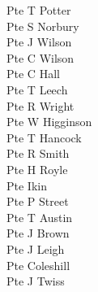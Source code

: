 \begin{multicols}{2}
  Pte T Potter \\
  Pte S Norbury \\
  Pte J Wilson \\
  Pte C Wilson \\
  Pte C Hall \\
  Pte T Leech \\
  Pte R Wright \\
  Pte W Higginson \\
  Pte T Hancock \\
  Pte R Smith \\
  Pte H Royle \\
  Pte Ikin \\
  Pte P Street \\
  Pte T Austin \\
  Pte J Brown \\
  Pte J Leigh \\
  Pte Coleshill \\
  Pte J Twiss \\
\end{multicols}
